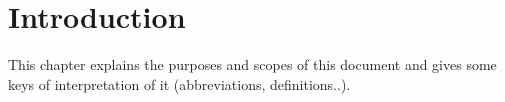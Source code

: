 \chapter{Introduction}

This chapter explains the purposes and scopes of this document and gives some keys of interpretation of it (abbreviations, definitions..).






